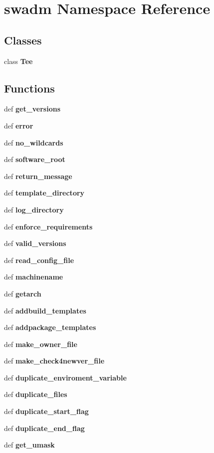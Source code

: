 \section{swadm Namespace Reference}
\label{namespaceswadm}


\subsection*{Classes}
\begin{CompactItemize}
\item 
class {\bf Tee}
\end{CompactItemize}
\subsection*{Functions}
\begin{CompactItemize}
\item 
def {\bf get\_\-versions}
\item 
def {\bf error}
\item 
def {\bf no\_\-wildcards}
\item 
def {\bf software\_\-root}
\item 
def {\bf return\_\-message}
\item 
def {\bf template\_\-directory}
\item 
def {\bf log\_\-directory}
\item 
def {\bf enforce\_\-requirements}
\item 
def {\bf valid\_\-versions}
\item 
def {\bf read\_\-config\_\-file}
\item 
def {\bf machinename}
\item 
def {\bf getarch}
\item 
def {\bf addbuild\_\-templates}
\item 
def {\bf addpackage\_\-templates}
\item 
def {\bf make\_\-owner\_\-file}
\item 
def {\bf make\_\-check4newver\_\-file}
\item 
def {\bf duplicate\_\-enviroment\_\-variable}
\item 
def {\bf duplicate\_\-files}
\item 
def {\bf duplicate\_\-start\_\-flag}
\item 
def {\bf duplicate\_\-end\_\-flag}
\item 
def {\bf get\_\-umask}
\end{CompactItemize}


